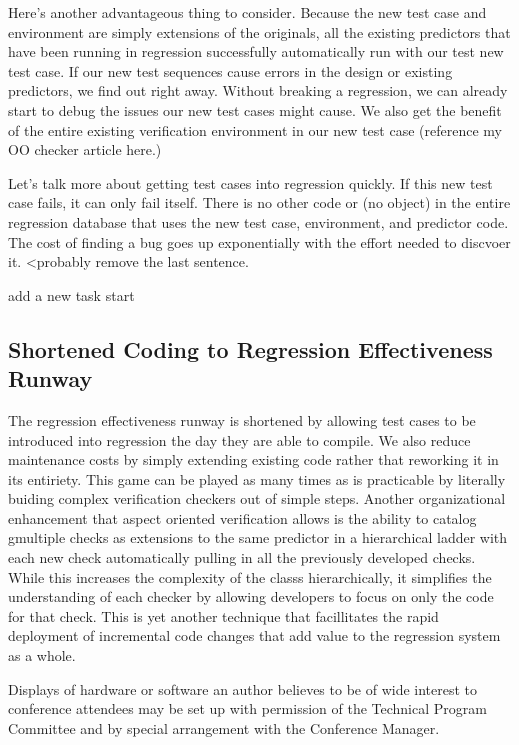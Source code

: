 \documentclass[twocolumn,letterpaper]{IEEEAerospaceCLS}  %
\begin{document}
Here's another  advantageous thing to consider. Because the new test case and environment are simply extensions of the originals, all the existing predictors that have been running in regression successfully automatically run with our test new test case. If our new test sequences cause errors in the design or existing predictors, we find out right away. Without breaking a regression, we can already start to debug the issues our new test cases might cause. We also get the benefit of the entire existing verification environment in our new test case (reference my OO checker article here.)

Let's talk more about getting test cases into regression quickly. If this new test case fails, it can only fail itself. There is no other code or (no object) in the entire regression database that uses the new test case, environment, and predictor code. The cost of finding a bug goes up exponentially with the effort needed to discvoer it. <probably remove the last sentence.

add a new task start
\subsection{Shortened Coding to Regression Effectiveness Runway}
The regression effectiveness runway is shortened by allowing test cases to be introduced into regression the day they are able to compile. We also reduce maintenance costs by simply extending existing code rather that reworking it in its entiriety. This game can be played as many times as is practicable by literally buiding complex verification checkers out of simple steps. Another organizational enhancement that aspect oriented verification allows is the ability to catalog gmultiple checks as extensions to the same predictor in a hierarchical ladder with each new check automatically pulling in all the previously developed checks. While this increases the complexity of the classs hierarchically, it simplifies the understanding of each checker by allowing developers to focus on only the code for that check. This is yet another technique that facillitates the rapid deployment of incremental code changes that add value to the regression system as a whole.


Displays of hardware or software an author believes to be of wide interest to conference attendees may be set up with permission of the Technical Program Committee and by special arrangement with the Conference Manager.

\end{document}
